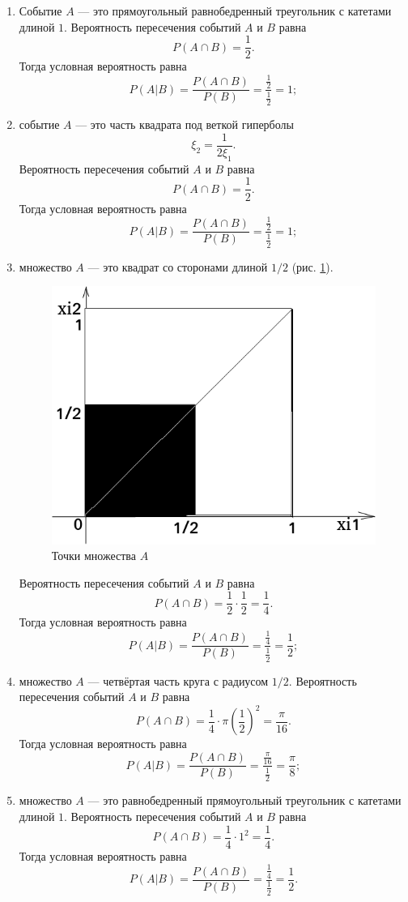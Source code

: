 \begin{enumerate}[label=\alph*)]
\item Событие $A$ --- это прямоугольный равнобедренный треугольник с катетами длиной $1$.
Вероятность пересечения событий $A$ и $B$ равна
$$P \left( A \cap B \right) =
\frac{1}{2}.$$
Тогда условная вероятность равна
$$P \left( \left. A \right| B \right) =
\frac{P \left( A \cap B \right) }{P \left( B \right) } =
\frac{ \frac{1}{2} }{ \frac{1}{2} } =
1;$$
\item событие $A$ --- это часть квадрата под веткой гиперболы
$$ \xi_2 = \frac{1}{2 \xi_1}.$$
Вероятность пересечения событий $A$ и $B$ равна
$$P \left( A \cap B \right) =
\frac{1}{2}.$$
Тогда условная вероятность равна
$$P \left( \left. A \right| B \right) =
\frac{P \left( A \cap B \right) }{P \left( B \right) } =
\frac{ \frac{1}{2} }{ \frac{1}{2} } =
1;$$
\item множество $A$ --- это квадрат со сторонами длиной $1/2$ (рис. \ref{fig:519}).
\begin{figure}[h!]
  \centering
  \includegraphics[width=.4\textwidth]{./pictures/5_19.png}
  \caption{Точки множества $A$}
  \label{fig:519}
\end{figure}
Вероятность пересечения событий $A$ и $B$ равна
$$P \left( A \cap B \right) =
\frac{1}{2} \cdot \frac{1}{2} =
\frac{1}{4}.$$
Тогда условная вероятность равна
$$P \left( \left. A \right| B \right) =
\frac{P \left( A \cap B \right) }{P \left( B \right) } =
\frac{ \frac{1}{4} }{ \frac{1}{2} } =
\frac{1}{2};$$
\item множество $A$ --- четвёртая часть круга с радиусом $1/2$.
Вероятность пересечения событий $A$ и $B$ равна
$$P \left( A \cap B \right) =
\frac{1}{4} \cdot \pi \left( \frac{1}{2} \right)^2 =
\frac{ \pi }{16}.$$
Тогда условная вероятность равна
$$P \left( \left. A \right| B \right) =
\frac{P \left( A \cap B \right) }{P \left( B \right) } =
\frac{ \frac{ \pi }{16} }{ \frac{1}{2} } =
\frac{ \pi }{8};$$
\item множество $A$ --- это равнобедренный прямоугольный треугольник с катетами длиной $1$.
Вероятность пересечения событий $A$ и $B$ равна
$$P \left( A \cap B \right) =
\frac{1}{4} \cdot 1^2 =
\frac{1}{4}.$$
Тогда условная вероятность равна
$$P \left( \left. A \right| B \right) =
\frac{P \left( A \cap B \right) }{P \left( B \right) } =
\frac{ \frac{1}{4} }{ \frac{1}{2} } =
\frac{1}{2}.$$
\end{enumerate}

